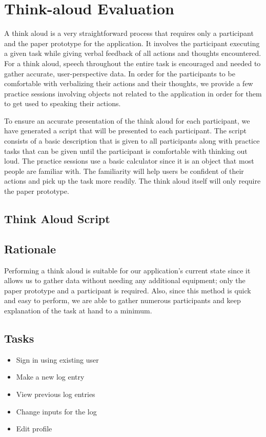 \documentclass[pdftex,12pt,a4paper]{report}
\begin{document}
\chapter{Think-aloud Evaluation}
A think aloud is a very straightforward process that requires only a participant and the paper prototype for the application. It involves the participant executing a given task while giving verbal feedback of all actions and thoughts encountered. For a think aloud, speech throughout the entire task is encouraged and needed to gather accurate, user-perspective data. In order for the participants to be comfortable with verbalizing their actions and their thoughts, we provide a few practice sessions involving objects not related to the application in order for them to get used to speaking their actions.

To ensure an accurate presentation of the think aloud for each participant, we have generated a script that will be presented to each participant. The script consists of a basic description that is given to all participants along with practice tasks that can be given until the participant is comfortable with thinking out loud. The practice sessions use a basic calculator since it is an object that most people are familiar with. The familiarity will help users be confident of their actions and pick up the task more readily. The think aloud itself will only require the paper prototype.

\section{Think Aloud Script}


\section{Rationale}
Performing a think aloud is suitable for our application's current state since it allows us to gather data without needing any additional equipment; only the paper prototype and a participant is required. Also, since this method is quick and easy to perform, we are able to gather numerous participants and keep explanation of the task at hand to a minimum.
\section{Tasks}
\begin{itemize}
\item Sign in using existing user
\item Make a new log entry
\item View previous log entries
\item Change inputs for the log
\item Edit profile
\end{itemize}
\end{document}
